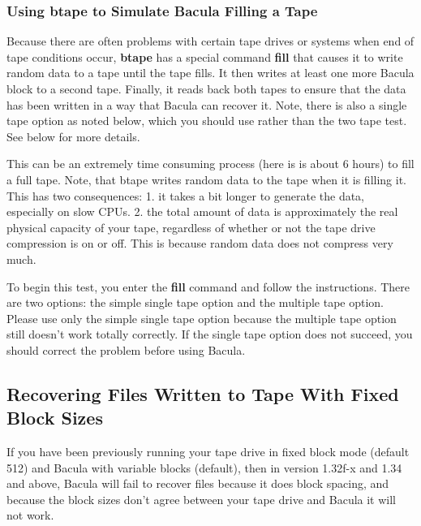 \label{fill}

\subsubsection*{Using btape to Simulate Bacula Filling a Tape}

Because there are often problems with certain tape drives or systems when end
of tape conditions occur, {\bf btape} has a special command {\bf fill} that
causes it to write random data to a tape until the tape fills. It then writes
at least one more Bacula block to a second tape. Finally, it reads back both
tapes to ensure that the data has been written in a way that Bacula can
recover it. Note, there is also a single tape option as noted below, which you
should use rather than the two tape test. See below for more details. 

This can be an extremely time consuming process (here is is about 6 hours) to
fill a full tape. Note, that btape writes random data to the tape when it is
filling it. This has two consequences: 1. it takes a bit longer to generate
the data, especially on slow CPUs. 2. the total amount of data is
approximately the real physical capacity of your tape, regardless of whether
or not the tape drive compression is on or off. This is because random data
does not compress very much. 

To begin this test, you enter the {\bf fill} command and follow the
instructions. There are two options: the simple single tape option and the
multiple tape option. Please use only the simple single tape option because
the multiple tape option still doesn't work totally correctly. If the single
tape option does not succeed, you should correct the problem before using
Bacula. 
\label{RecoveringFiles}

\subsection*{Recovering Files Written to Tape With Fixed Block Sizes}

If you have been previously running your tape drive in fixed block mode
(default 512) and Bacula with variable blocks (default), then in version
1.32f-x and 1.34 and above, Bacula will fail to recover files because it does
block spacing, and because the block sizes don't agree between your tape drive
and Bacula it will not work. 

